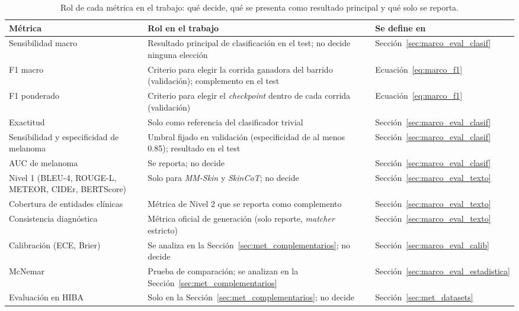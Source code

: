 \begin{table}[H]
    \caption{Rol de cada métrica en el trabajo: qué decide, qué se presenta como resultado principal y qué solo se reporta.}
    \label{tab:met_roles}
    \begin{tabularx}{\textwidth}{@{}>{\raggedright\arraybackslash}p{4.6cm}
        >{\raggedright\arraybackslash\hspace{0pt}}X >{\raggedright\arraybackslash\hspace{0pt}}p{3.6cm}@{}}
        \toprule
        \textbf{Métrica} & \textbf{Rol en el trabajo} & \textbf{Se define en} \\
        \midrule
        Sensibilidad macro & Resultado principal de clasificación en el test; no decide ninguna elección & Sección~\ref{sec:marco_eval_clasif} \\
        \filasep
        F1 macro & Criterio para elegir la corrida ganadora del barrido (validación); complemento en el test & Ecuación~\ref{eq:marco_f1} \\
        \filasep
        F1 ponderado & Criterio para elegir el \emph{checkpoint} dentro de cada corrida (validación) & Ecuación~\ref{eq:marco_f1} \\
        \filasep
        Exactitud & Solo como referencia del clasificador trivial & Sección~\ref{sec:marco_eval_clasif} \\
        \filasep
        Sensibilidad y especificidad de melanoma & Umbral fijado en validación (especificidad de al menos 0.85); resultado en el test & Sección~\ref{sec:marco_eval_clasif} \\
        \filasep
        AUC de melanoma & Se reporta; no decide & Sección~\ref{sec:marco_eval_clasif} \\
        \filasep
        Nivel 1 (BLEU-4, ROUGE-L, METEOR, CIDEr, BERTScore) & Solo para \emph{MM-Skin} y \emph{SkinCoT}; no decide & Sección~\ref{sec:marco_eval_texto} \\
        \filasep
        Cobertura de entidades clínicas & Métrica de Nivel 2 que se reporta como complemento & Sección~\ref{sec:marco_eval_texto} \\
        \filasep
        Consistencia diagnóstica & Métrica oficial de generación (solo reporte, \emph{matcher} estricto) & Sección~\ref{sec:marco_eval_texto} \\
        \filasep
        Calibración (ECE, Brier) & Se analiza en la Sección~\ref{sec:met_complementarios}; no decide & Sección~\ref{sec:marco_eval_calib} \\
        \filasep
        McNemar & Prueba de comparación; se analizan en la Sección~\ref{sec:met_complementarios} & Sección~\ref{sec:marco_eval_estadistica} \\
        \filasep
        Evaluación en HIBA & Solo en la Sección~\ref{sec:met_complementarios}; no decide & Sección~\ref{sec:met_datasets} \\
        \bottomrule
    \end{tabularx}
\end{table}
